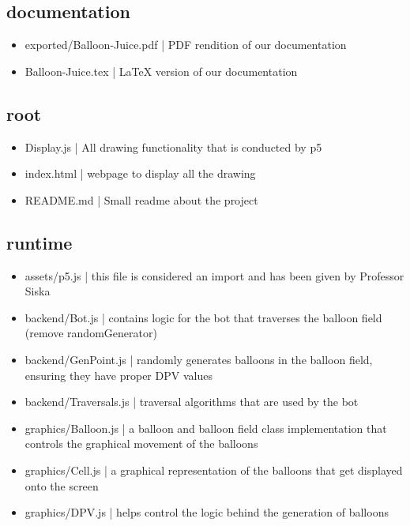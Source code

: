 \documentclass{article}
\begin{document}
\subsection{documentation}
\begin{itemize}
\item exported/Balloon-Juice.pdf | PDF rendition of our documentation
\item Balloon-Juice.tex | LaTeX version of our documentation
\end{itemize}

\subsection{root}

\begin{itemize}
\item Display.js | All drawing functionality that is conducted by p5
\item index.html | webpage to display all the drawing
\item README.md | Small readme about the project
\end{itemize}

\subsection{runtime}

\begin{itemize}
\item assets/p5.js | this file is considered an import and has been given by Professor Siska
\item backend/Bot.js | contains logic for the bot that traverses the balloon field (remove randomGenerator)
\item backend/GenPoint.js | randomly generates balloons in the balloon field, ensuring they have proper DPV values
\item backend/Traversals.js | traversal algorithms that are used by the bot
\item graphics/Balloon.js | a balloon and balloon field class implementation that controls the graphical movement of the balloons
\item graphics/Cell.js | a graphical representation of the balloons that get displayed onto the screen
\item graphics/DPV.js | helps control the logic behind the generation of balloons
\end{itemize}

\newpage
\end{document}

